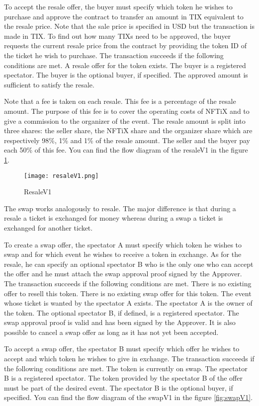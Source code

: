 \documentclass[a4paper,11pt,oneside]{report}
\begin{document}
To accept the resale offer, the buyer must specify which token he wishes to purchase and approve the contract to transfer an amount in TIX equivalent to the resale price. Note that the sale price is specified in USD but the transaction is made in TIX. To find out how many TIXs need to be approved, the buyer requests the current resale price from the contract by providing the token ID of the ticket he wish to purchase. The transaction succeeds if the following conditions are met. A resale offer for the token exists. The buyer is a registered spectator. The buyer is the optional buyer, if specified. The approved amount is sufficient to satisfy the resale.

Note that a fee is taken on each resale. This fee is a percentage of the resale amount. The purpose of this fee is to cover the operating costs of NFTiX and to give a commission to the organizer of the event. The resale amount is split into three shares: the seller share, the NFTiX share and the organizer share which are respectively 98\%, 1\% and 1\% of the resale amount. The seller and the buyer pay each 50\% of this fee. You can find the flow diagram of the resaleV1 in the figure \hyperref[fig:resaleV1]{\ref{fig:resaleV1}}.

\begin{figure}[h!]
  \texttt{[image: resaleV1.png]}
  \caption{ResaleV1}
  \label{fig:resaleV1}
\end{figure}

The swap works analogously to resale. The major difference is that during a resale a ticket is exchanged for money whereas during a swap a ticket is exchanged for another ticket.

To create a swap offer, the spectator A must specify which token he wishes to swap and for which event he wishes to receive a token in exchange. As for the resale, he can specify an optional spectator B who is the only one who can accept the offer and he must attach the swap approval proof signed by the Approver. The transaction succeeds if the following conditions are met. There is no existing offer to resell this token. There is no existing swap offer for this token. The event whose ticket is wanted by the spectator A exists. The spectator A is the owner of the token. The optional spectator B, if defined, is a registered spectator. The swap approval proof is valid and has been signed by the Approver. It is also possible to cancel a swap offer as long as it has not yet been accepted.

To accept a swap offer, the spectator B must specify which offer he wishes to accept and which token he wishes to give in exchange. The transaction succeeds if the following conditions are met. The token is currently on swap. The spectator B is a registered spectator. The token provided by the spectator B of the offer must be part of the desired event. The spectator B is the optional buyer, if specified. You can find the flow diagram of the swapV1 in the figure \hyperref[fig:swapV1]{\ref{fig:swapV1}}.
\end{document}
